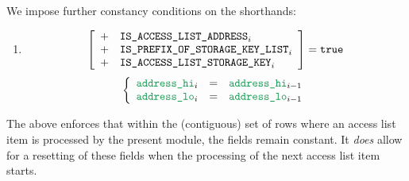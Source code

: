 We impose further constancy conditions on the
 shorthands:
\begin{enumerate}
	\item
		\If
		\[
			\left[ \begin{array}{cl}
				+ & \texttt{IS\_ACCESS\_LIST\_ADDRESS}      _{i} \\
				+ & \texttt{IS\_PREFIX\_OF\_STORAGE\_KEY\_LIST} _{i} \\
				+ & \texttt{IS\_ACCESS\_LIST\_STORAGE\_KEY}   _{i} \\
			\end{array} \right]
			= \texttt{true}
		\]
		\Then
		\[
			\left\{ \begin{array}{lcl}
				\locAddressHi _{i} & = & \locAddressHi _{i - 1} \\
				\locAddressLo _{i} & = & \locAddressLo _{i - 1} \\
			\end{array} \right.
		\]
\end{enumerate}
\saNote{}
The above enforces that within the (contiguous) set of rows where an access list item is processed
by the present module, the  fields remain constant.
It \emph{does} allow for a resetting of these fields when the processing of the next access list item starts.

